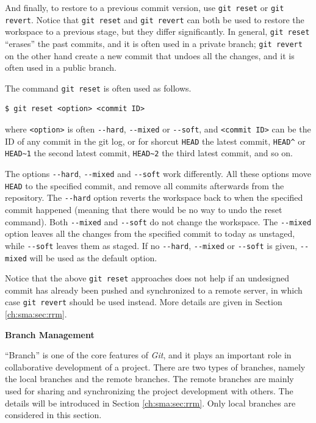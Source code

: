 And finally, to restore to a previous commit version, use \verb|git reset| or \verb|git revert|. Notice that \verb|git reset| and \verb|git revert| can both be used to restore the workspace to a previous stage, but they differ significantly. In general, \verb|git reset| ``erases'' the past commits, and it is often used in a private branch; \verb|git revert| on the other hand create a new commit that undoes all the changes, and it is often used in a public branch.

The command \verb|git reset| is often used as follows.
\begin{lstlisting}
$ git reset <option> <commit ID>
\end{lstlisting}
where \verb|<option>| is often \verb|--hard|, \verb|--mixed| or \verb|--soft|, and \verb|<commit ID>| can be the ID of any commit in the git log, or for shorcut \verb|HEAD| the latest commit, \verb|HEAD^| or \verb|HEAD~1| the second latest commit, \verb|HEAD~2| the third latest commit, and so on.

The options \verb|--hard|, \verb|--mixed| and \verb|--soft| work differently. All these options move \verb|HEAD| to the specified commit, and remove all commits afterwards from the repository. The \verb|--hard| option reverts the workspace back to when the specified commit happened (meaning that there would be no way to undo the reset command). Both \verb|--mixed| and \verb|--soft| do not change the workspace. The \verb|--mixed| option leaves all the changes from the specified commit to today as unstaged, while \verb|--soft| leaves them as staged. If no \verb|--hard|, \verb|--mixed| or \verb|--soft| is given, \verb|--mixed| will be used as the default option.

Notice that the above \verb|git reset| approaches does not help if an undesigned commit has already been pushed and synchronized to a remote server, in which case \verb|git revert| should be used instead. More details are given in Section \ref{ch:sma:sec:rrm}.

\vspace{10pt}

\noindent \textbf{Branch Management}

\vspace{10pt}

``Branch'' is one of the core features of \textit{Git}, and it plays an important role in collaborative development of a project. There are two types of branches, namely the local branches and the remote branches. The remote branches are mainly used for sharing and synchronizing the project development with others. The details will be introduced in Section \ref{ch:sma:sec:rrm}. Only local branches are considered in this section.

